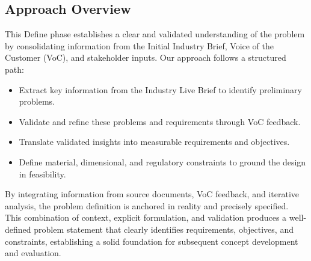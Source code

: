 \documentclass[9pt]{extarticle}
\begin{document}
\begin{minipage}[t]{0.5\textwidth}
	\vspace*{-1em}
	\subsection{Approach Overview}
	This Define phase establishes a clear and validated understanding of the problem by consolidating information from the Initial Industry Brief, Voice of the Customer (VoC), and stakeholder inputs. Our approach follows a structured path:\\[-0.3em]
	\begin{itemize}[itemsep=2mm]
		\item Extract key information from the Industry Live Brief to identify preliminary problems.
		\item Validate and refine these problems and requirements through VoC feedback.
		\item Translate validated insights into measurable requirements and objectives.
		\item Define material, dimensional, and regulatory constraints to ground the design in feasibility.
	\end{itemize}\vspace{1.2em}
By integrating information from source documents, VoC feedback, and iterative analysis, the problem definition is anchored in reality and precisely specified.\\[0.8em]
This combination of context, explicit formulation, and validation produces a well-defined problem statement that clearly identifies requirements, objectives, and constraints, establishing a solid foundation for subsequent concept development and evaluation.
\end{minipage}

\newpage

\thispagestyle{plain}
\end{document}
